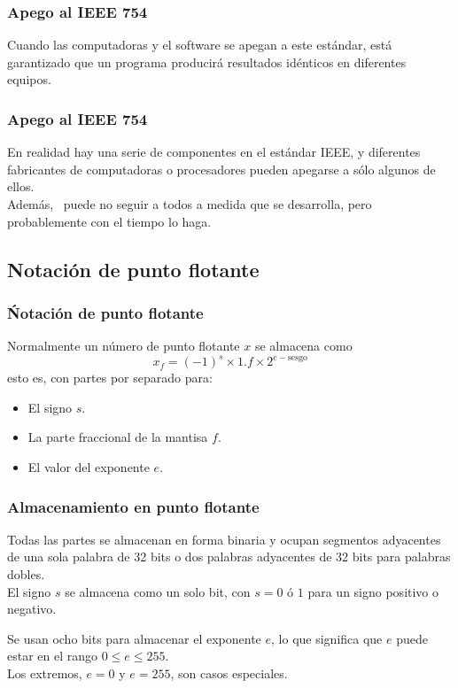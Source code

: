 \begin{frame}
\frametitle{Apego al IEEE 754}
 Cuando las computadoras y el software se apegan a este estándar, está garantizado que un programa producirá resultados idénticos en diferentes equipos.
 \end{frame}
 \begin{frame}
 \frametitle{Apego al IEEE 754}
 En realidad hay una serie de componentes en el estándar IEEE, y diferentes fabricantes de computadoras o procesadores pueden apegarse a sólo algunos de ellos.
 \\
 \bigskip
 Además, \python\ puede no seguir a todos a medida que se desarrolla, pero probablemente con el tiempo lo haga.
 \end{frame}
 \subsection{Notación de punto flotante}
 \begin{frame}
 \frametitle{Ńotación de punto flotante}
 Normalmente un número de punto flotante $x$ se almacena como
 \begin{equation}
 x_{f} = (-1)^{s} \times 1.f \times 2^{e - \text{sesgo}}
 \label{eq:ecuacion_01_02}
 \end{equation}
 esto es, con partes por separado para:
 \begin{itemize}[<+->]
 \item El signo $s$.
 \item La parte fraccional de la mantisa $f$.
 \item El valor del exponente $e$.
\end{itemize}
\end{frame}
\begin{frame}
\frametitle{Almacenamiento en punto flotante}
Todas las partes se almacenan en forma binaria y ocupan segmentos adyacentes de una sola palabra de 32 bits o dos palabras adyacentes de 32 bits para palabras dobles.
\\
\bigskip
El signo $s$ se almacena como un solo bit, con $s = 0$ ó $1$ para un signo positivo o negativo.
\end{frame}
\begin{frame}
Se usan ocho bits para almacenar el exponente $e$, lo que significa que $e$ puede estar en el rango $0 \leq e \leq 255$.
\\
\bigskip
Los extremos, $e = 0$ y $e = 255$, son casos especiales.
\end{frame}
